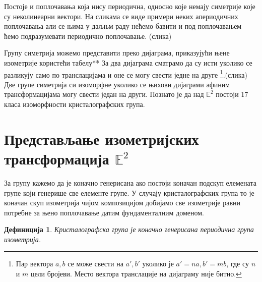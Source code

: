 \documentclass[12pt]{report}
\newtheorem{definition}[theorem]{\bf Дефиниција}
\begin{document}
Постоје и поплочавања која нису периодична, односно које немају симетрије које су неколинеарни вектори. На сликама се виде примери неких апериодичних поплочавања али се њима у даљњм раду нећемо бавити и под поплочавањем ћемо подразумевати периодично поплочавање. (слика)

Групу симетрија можемо представити преко дијаграма, приказујући њене изометрије користећи табелу**
За два дијаграма сматрамо да су исти уколико се разликују само по транслацијама и оне се могу свести једне на друге \footnote{Пар вектора $a,b$ се може свести на $a',b'$ уколико је $a'=na, b'=mb$, где су $n$ и $m$ цели бројеви. Место вектора транслације на дијаграму није битно.}.(слика)
Две групе симетрија си изоморфне уколико се њихови дијаграми афиним трансформацијама могу свести један на други. 
Познато је да над \(\mathbb{E}^2\) постоји 17 класа изоморфности кристалографских група. 










    \section{\texorpdfstring{Представљање изометријских трансформација 
\(\mathbb{E}^2\)}{Izometrijske transformacije u \textbackslash{}mathbb\{Е\}\^{}2}}\label{izometrijske-transformacije-u-mathbbr2}


За групу кажемо да је коначно генерисана ако постоји коначан подскуп елемената групе који генерише све елементе групе. У случају кристалографских група то је коначан скуп изометрија чијом композицијом добијамо све изометрије равни потребне за њено поплочавање датим фундаменталним доменом.

\begin{definition} Кристалографска група је коначно
генерисана периодична група изометрија.
\end{definition}
\end{document}
